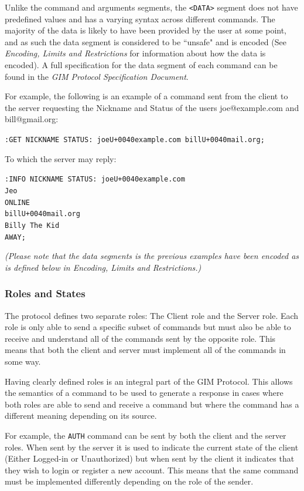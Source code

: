 Unlike the command and arguments segments, the \texttt{<DATA>} segment does not have predefined values and has a varying syntax across different commands. The majority of the data is likely to have been provided by the user at some point, and as such the data segment is considered to be ``unsafe" and is encoded (See \emph{Encoding, Limits and Restrictions} for information about how the data is encoded). A full specification for the data segment of each command can be found in the \emph{GIM Protocol Specification Document}.

For example, the following is an example of a command sent from the client to the server requesting the Nickname and Status of the users joe@example.com and bill@gmail.org:

\texttt{:GET NICKNAME STATUS: joe\SLASH U+0040example.com bill\SLASH U+0040mail.org;}

To which the server may reply:

\texttt{:INFO NICKNAME STATUS: joe\SLASH U+0040example.com\\
Jeo\\
ONLINE\\
bill\SLASH U+0040mail.org\\
Billy The Kid\\
AWAY;}

\emph{(Please note that the data segments is the previous examples have been encoded as is defined below in Encoding, Limits and Restrictions.)}

\subsubsection{Roles and States}
The protocol defines two separate roles: The Client role and the Server role. Each role is only able to send a specific subset of commands but must also be able to receive and understand all of the commands sent by the opposite role. This means that both the client and server must implement all of the commands in some way.

Having clearly defined roles is an integral part of the GIM Protocol. This allows the semantics of a command to be used to generate a response in cases where both roles are able to send and receive a command but where the command has a different meaning depending on its source. 

For example, the \texttt{AUTH} command can be sent by both the client and the server roles. When sent by the server it is used to indicate the current state of the client (Either Logged-in or Unauthorized) but when sent by the client it indicates that they wish to login or register a new account. This means that the same command must be implemented differently depending on the role of the sender.

